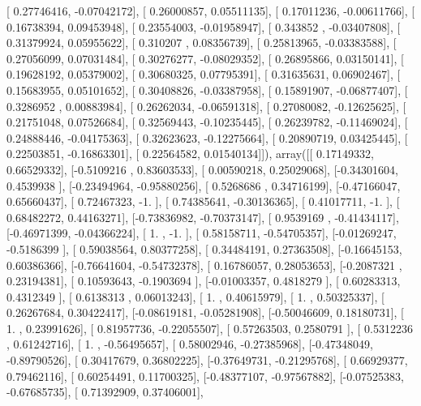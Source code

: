 \documentclass{article}
\begin{document}
       [ 0.27746416, -0.07042172],
       [ 0.26000857,  0.05511135],
       [ 0.17011236, -0.00611766],
       [ 0.16738394,  0.09453948],
       [ 0.23554003, -0.01958947],
       [ 0.343852  , -0.03407808],
       [ 0.31379924,  0.05955622],
       [ 0.310207  ,  0.08356739],
       [ 0.25813965, -0.03383588],
       [ 0.27056099,  0.07031484],
       [ 0.30276277, -0.08029352],
       [ 0.26895866,  0.03150141],
       [ 0.19628192,  0.05379002],
       [ 0.30680325,  0.07795391],
       [ 0.31635631,  0.06902467],
       [ 0.15683955,  0.05101652],
       [ 0.30408826, -0.03387958],
       [ 0.15891907, -0.06877407],
       [ 0.3286952 ,  0.00883984],
       [ 0.26262034, -0.06591318],
       [ 0.27080082, -0.12625625],
       [ 0.21751048,  0.07526684],
       [ 0.32569443, -0.10235445],
       [ 0.26239782, -0.11469024],
       [ 0.24888446, -0.04175363],
       [ 0.32623623, -0.12275664],
       [ 0.20890719,  0.03425445],
       [ 0.22503851, -0.16863301],
       [ 0.22564582,  0.01540134]]), array([[ 0.17149332,  0.66529332],
       [-0.5109216 ,  0.83603533],
       [ 0.00590218,  0.25029068],
       [-0.34301604,  0.4539938 ],
       [-0.23494964, -0.95880256],
       [ 0.5268686 ,  0.34716199],
       [-0.47166047,  0.65660437],
       [ 0.72467323, -1.        ],
       [ 0.74385641, -0.30136365],
       [ 0.41017711, -1.        ],
       [ 0.68482272,  0.44163271],
       [-0.73836982, -0.70373147],
       [ 0.9539169 , -0.41434117],
       [-0.46971399, -0.04366224],
       [ 1.        , -1.        ],
       [ 0.58158711, -0.54705357],
       [-0.01269247, -0.5186399 ],
       [ 0.59038564,  0.80377258],
       [ 0.34484191,  0.27363508],
       [-0.16645153,  0.60386366],
       [-0.76641604, -0.54732378],
       [ 0.16786057,  0.28053653],
       [-0.2087321 ,  0.23194381],
       [ 0.10593643, -0.1903694 ],
       [-0.01003357,  0.4818279 ],
       [ 0.60283313,  0.4312349 ],
       [ 0.6138313 ,  0.06013243],
       [ 1.        ,  0.40615979],
       [ 1.        ,  0.50325337],
       [ 0.26267684,  0.30422417],
       [-0.08619181, -0.05281908],
       [-0.50046609,  0.18180731],
       [ 1.        ,  0.23991626],
       [ 0.81957736, -0.22055507],
       [ 0.57263503,  0.2580791 ],
       [ 0.5312236 ,  0.61242716],
       [ 1.        , -0.56495657],
       [ 0.58002946, -0.27385968],
       [-0.47348049, -0.89790526],
       [ 0.30417679,  0.36802225],
       [-0.37649731, -0.21295768],
       [ 0.66929377,  0.79462116],
       [ 0.60254491,  0.11700325],
       [-0.48377107, -0.97567882],
       [-0.07525383, -0.67685735],
       [ 0.71392909,  0.37406001],
\end{document}

